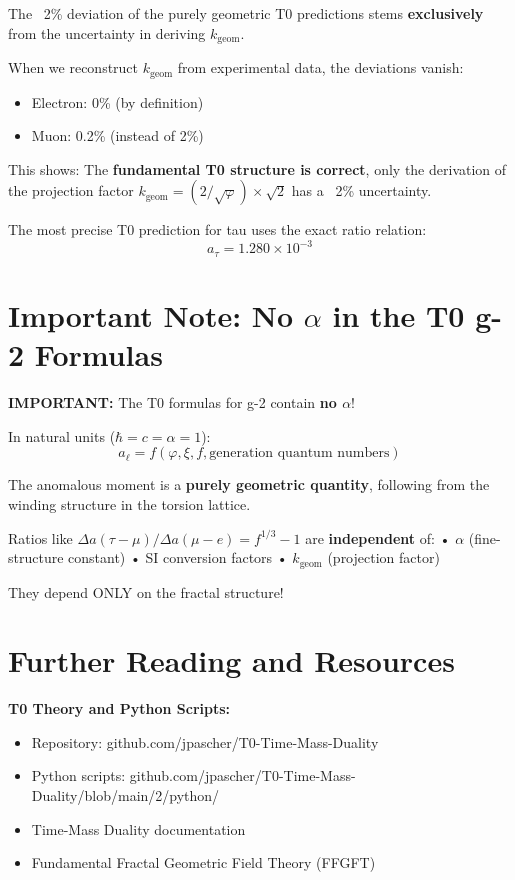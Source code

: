 	\begin{keypoint}
		The ~2\% deviation of the purely geometric T0 predictions stems \textbf{exclusively} from the uncertainty in deriving $k_{\text{geom}}$.
		
		When we reconstruct $k_{\text{geom}}$ from experimental data, the deviations vanish:
		\begin{itemize}
			\item Electron: 0\% (by definition)
			\item Muon: 0.2\% (instead of 2\%)
		\end{itemize}
		
		This shows: The \textbf{fundamental T0 structure is correct}, only the derivation of the projection factor $k_{\text{geom}} = (2/\sqrt{\varphi}) \times \sqrt{2}$ has a ~2\% uncertainty.
		
		The most precise T0 prediction for tau uses the exact ratio relation:
		\begin{equation}
			\boxed{a_\tau = 1.280 \times 10^{-3}}
		\end{equation}
	\end{keypoint}
	
	\section{Important Note: No $\alpha$ in the T0 g-2 Formulas}
	
	\textbf{IMPORTANT:}
	The T0 formulas for g-2 contain \textbf{no $\alpha$}!
	
	In natural units ($\hbar = c = \alpha = 1$):
	\[ a_\ell = f(\varphi, \xi, f, \text{generation quantum numbers}) \]
	
	The anomalous moment is a \textbf{purely geometric quantity},
	following from the winding structure in the torsion lattice.
	
	Ratios like $\Delta a(\tau-\mu)/\Delta a(\mu-e) = f^{1/3} - 1$ are
	\textbf{independent} of:
	• $\alpha$ (fine-structure constant)
	• SI conversion factors
	• $k_{\text{geom}}$ (projection factor)
	
	They depend ONLY on the fractal structure!
	
	\section*{Further Reading and Resources}
	
	\textbf{T0 Theory and Python Scripts:}
	\begin{itemize}
		\item Repository: github.com/jpascher/T0-Time-Mass-Duality
		\item Python scripts: github.com/jpascher/T0-Time-Mass-Duality/blob/main/2/python/
		\item Time-Mass Duality documentation
		\item Fundamental Fractal Geometric Field Theory (FFGFT)
	\end{itemize}
	
